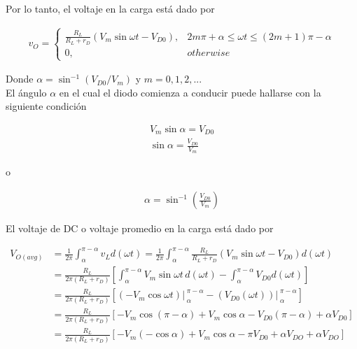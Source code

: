 \documentclass{article}
\begin{document}
Por lo tanto, el voltaje en la carga está dado por

\begin{align}
	v_O= \left\{ 
	\begin{array}{lc} \frac{R_L}{R_L + r_D} \left( V_m \sin \omega t - V_{D0} \right), & 2m\pi + \alpha \leq \omega t \leq (2m + 1)\pi - \alpha \\
		0, & otherwise
	\end{array} \right.
\end{align}

Donde $\alpha = \sin ^{-1} (V_{D0}/V_m)$ y $m=0,1, 2, ...$ \\

El ángulo $\alpha$ en el cual el diodo comienza a conducir puede hallarse con la siguiente condición

\begin{align}
	V_m \sin \alpha = V_{D0} \nonumber \\
	\sin \alpha = \frac{V_{D0}}{V_m} \nonumber
\end{align}

o

\begin{align}
	\alpha = \sin ^{-1} \left( \frac{V_{D0}}{V_m} \right) 
\end{align}

El voltaje de DC o voltaje promedio en la carga está dado por

\begin{align}
	V_{O(avg)} &= \frac{1}{2\pi} \int_{\alpha}^{\pi - \alpha} v_L d(\omega t) = \frac{1}{2\pi} \int_{\alpha}^{\pi - \alpha} \frac{R_L}{R_L + r_D} \left( V_m \sin \omega t - V_{D0} \right) d(\omega t) \nonumber \\
	&= \frac{R_L}{2\pi (R_L + r_D)} \left[ \int_{\alpha}^{\pi - \alpha} V_m \sin \omega t \, d(\omega t) - \int_{\alpha}^{\pi - \alpha} V_{D0} d(\omega t) \right] \nonumber \\
	&= \frac{R_L}{2\pi (R_L + r_D)} \left[  \left.{\left( -V_m \cos \omega t \right)}\right|_{\;\alpha}^{\;\pi - \alpha} - \left.{\left( V_{D0}(\omega t) \right)}\right|_{\;\alpha}^{\;\pi - \alpha} \right] \nonumber \\
	&= \frac{R_L}{2\pi (R_L + r_D)} \left[ -V_m \cos (\pi - \alpha) + V_m \cos \alpha - V_{D0}(\pi - \alpha) + \alpha V_{D0} \right] \nonumber \\
	&= \frac{R_L}{2\pi (R_L + r_D)} \left[ -V_m (-\cos \alpha) + V_m \cos \alpha - \pi V_{D0} + \alpha V_{DO} + \alpha V_{DO} \right] \nonumber
\end{align}
\end{document}

